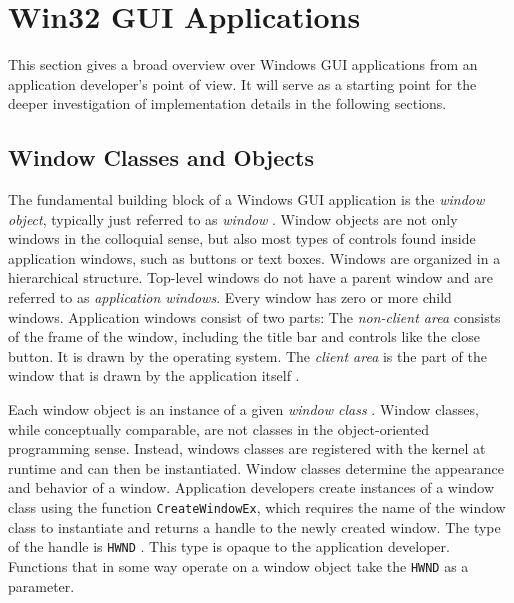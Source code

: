 	\section{Win32 GUI Applications}\label{sec:win32gui}
		This section gives a broad overview over Windows GUI applications from an
		application developer's point of view. It will serve as a starting point
		for the deeper investigation of implementation details in the following
		sections.

		\subsection{Window Classes and Objects}
			The fundamental building block of a Windows GUI application is the
			\textit{window object}, typically just referred to as \textit{window} \cite{whatiswindow}.
			Window objects are not only windows in the colloquial sense, but also
			most types of controls found inside application windows, such as buttons
			or text boxes. Windows are organized in a hierarchical structure.
			Top-level windows do not have a parent window and are referred to as
			\textit{application windows}. Every window has zero or more child
			windows. Application windows consist of two parts: The \textit{non-client
			area} consists of the frame of the window, including the title bar and
			controls like the close button. It is drawn by the operating system.
			The \textit{client area} is the part of the window that is drawn by
			the application itself
			\cite{whatiswindow}.

			Each window object is an instance of a given \textit{window class} \cite{creatingwindow}.
			Window classes, while conceptually comparable, are not classes in
			the object-oriented programming sense. Instead, windows classes are
			registered with the kernel at runtime and can then be instantiated.
			Window classes determine the appearance and behavior of a window.
			Application developers create instances of a window class
			using the function
			\texttt{CreateWindowEx}, which requires the name of the window class
			to instantiate and returns a handle to the newly created window.
			The type of the handle is \texttt{HWND} \cite{whatiswindow}. This type is opaque to the
			application developer. Functions that in some way operate on a
			window object take the \texttt{HWND} as a parameter.

